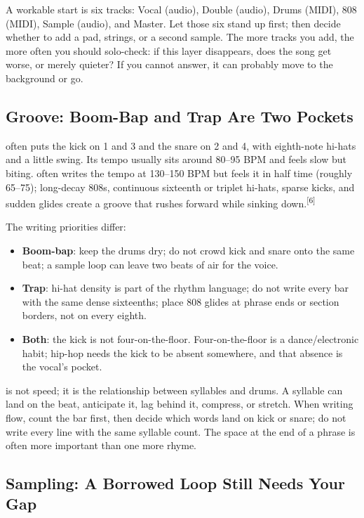 A workable start is six tracks: Vocal (audio), Double (audio), Drums (MIDI), 808 (MIDI), Sample (audio), and Master. Let those six stand up first; then decide whether to add a pad, strings, or a second sample. The more tracks you add, the more often you should solo-check: if this layer disappears, does the song get worse, or merely quieter? If you cannot answer, it can probably move to the background or go.

\subsection{Groove: Boom-Bap and Trap Are Two Pockets}
\label{sec:hiphop-groove}

 often puts the kick on 1 and 3 and the snare on 2 and 4, with eighth-note hi-hats and a little swing. Its tempo usually sits around 80--95 BPM and feels slow but biting.  often writes the tempo at 130--150 BPM but feels it in half time (roughly 65--75); long-decay 808s, continuous sixteenth or triplet hi-hats, sparse kicks, and sudden glides create a groove that rushes forward while sinking down.{\textsuperscript{[6]}}

The writing priorities differ:

\begin{itemize}
\item \textbf{Boom-bap}: keep the drums dry; do not crowd kick and snare onto the same beat; a sample loop can leave two beats of air for the voice.
\item \textbf{Trap}: hi-hat density is part of the rhythm language; do not write every bar with the same dense sixteenths; place 808 glides at phrase ends or section borders, not on every eighth.
\item \textbf{Both}: the kick is not four-on-the-floor. Four-on-the-floor is a dance/electronic habit; hip-hop needs the kick to be absent somewhere, and that absence is the vocal's pocket.
\end{itemize}

 is not speed; it is the relationship between syllables and drums. A syllable can land on the beat, anticipate it, lag behind it, compress, or stretch. When writing flow, count the bar first, then decide which words land on kick or snare; do not write every line with the same syllable count. The space at the end of a phrase is often more important than one more rhyme.

\subsection{Sampling: A Borrowed Loop Still Needs Your Gap}
\label{sec:hiphop-sample}

